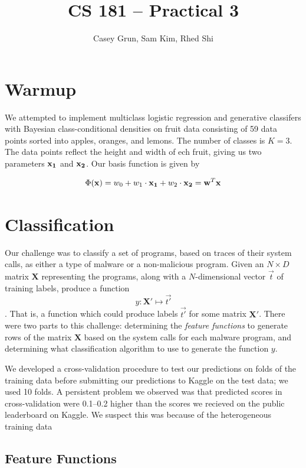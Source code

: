\documentclass[11pt]{amsart}
\title{CS 181 -- Practical 3}
\author{Casey Grun, Sam Kim, Rhed Shi}
\newcommand{\mat}[1]{\mathbf{#1}}
\begin{document}
\maketitle

\section{Warmup}

We attempted to implement multiclass logistic regression and generative classifers with Bayesian class-conditional densities on fruit data consisting of 59 data points sorted into apples, oranges, and lemons. The number of classes is $K = 3$. The data points reflect the height and width of ech fruit, giving us two parameters $\bold{x_1}$ and $\bold{x_2}$. Our basis function is given by

$$ \Phi(\bold{x}) = w_0 + w_1 \cdot \bold{x_1} + w_2 \cdot \bold{x_2}  = \bold{w}^T \bold{x} $$



\section{Classification}

Our challenge was to classify a set of programs, based on traces of their system calls, as either a type of malware or a non-malicious program. Given an $N \times D$ matrix $\mat{X}$ representing the programs, along with a $N$-dimensional vector $\vec{t}$ of training labels, produce a function 
$$y : \mat{X'} \mapsto \vec{t'}$$.
That is, a function which could produce labels $\vec{t'}$ for some matrix $\mat{X'}$. There were two parts to this challenge: determining the \emph{feature functions} to generate rows of the matrix $\mat{X}$ based on the system calls for each malware program, and determining what classification algorithm to use to generate the function $y$.

We developed a cross-validation procedure to test our predictions on folds of the training data before submitting our predictions to Kaggle on the test data; we used 10 folds. A persistent problem we observed was that predicted scores in cross-validation were 0.1--0.2 higher than the scores we recieved on the public leaderboard on Kaggle. We suspect this was because of the heterogeneous training data 

\subsection{Feature Functions}
\end{document}
